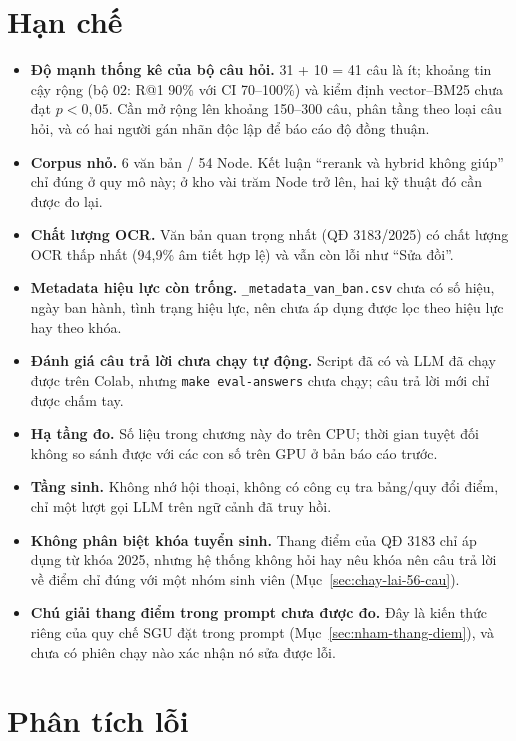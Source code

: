 \section{Hạn chế}

\begin{itemize}
  \item \textbf{Độ mạnh thống kê của bộ câu hỏi.} 31 + 10 = 41 câu là ít; khoảng tin cậy rộng (bộ 02:
        R@1 90\% với CI 70--100\%) và kiểm định vector--BM25 chưa đạt $p<0{,}05$. Cần mở rộng lên
        khoảng 150--300 câu, phân tầng theo loại câu hỏi, và có hai người gán nhãn độc lập để báo cáo
        độ đồng thuận.
  \item \textbf{Corpus nhỏ.} 6 văn bản / 54 Node. Kết luận ``rerank và hybrid không giúp'' chỉ đúng ở
        quy mô này; ở kho vài trăm Node trở lên, hai kỹ thuật đó cần được đo lại.
  \item \textbf{Chất lượng OCR.} Văn bản quan trọng nhất (QĐ 3183/2025) có chất lượng OCR thấp nhất
        (94,9\% âm tiết hợp lệ) và vẫn còn lỗi như ``Sửa đồi''.
  \item \textbf{Metadata hiệu lực còn trống.} \texttt{\_metadata\_van\_ban.csv} chưa có số hiệu, ngày
        ban hành, tình trạng hiệu lực, nên chưa áp dụng được lọc theo hiệu lực hay theo khóa.
  \item \textbf{Đánh giá câu trả lời chưa chạy tự động.} Script đã có và LLM đã chạy được trên Colab,
        nhưng \texttt{make eval-answers} chưa chạy; câu trả lời mới chỉ được chấm tay.
  \item \textbf{Hạ tầng đo.} Số liệu trong chương này đo trên CPU; thời gian tuyệt đối không so sánh
        được với các con số trên GPU ở bản báo cáo trước.
  \item \textbf{Tầng sinh.} Không nhớ hội thoại, không có công cụ tra bảng/quy đổi điểm, chỉ một lượt
        gọi LLM trên ngữ cảnh đã truy hồi.
  \item \textbf{Không phân biệt khóa tuyển sinh.} Thang điểm của QĐ 3183 chỉ áp dụng từ khóa 2025, nhưng
        hệ thống không hỏi hay nêu khóa nên câu trả lời về điểm chỉ đúng với một nhóm sinh viên
        (Mục~\ref{sec:chay-lai-56-cau}).
  \item \textbf{Chú giải thang điểm trong prompt chưa được đo.} Đây là kiến thức riêng của quy chế SGU
        đặt trong prompt (Mục~\ref{sec:nham-thang-diem}), và chưa có phiên chạy nào xác nhận nó sửa được lỗi.
\end{itemize}


\section{Phân tích lỗi}


